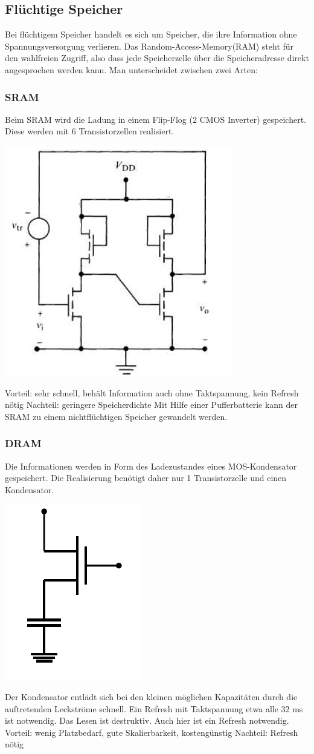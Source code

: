 \subsection{Flüchtige Speicher}
	Bei flüchtigem Speicher handelt es sich um Speicher, die ihre Information ohne Spannungsversorgung verlieren.
	Das Random-Access-Memory(RAM) steht für den wahlfreien Zugriff, also dass jede Speicherzelle über die Speicheradresse direkt angesprochen werden kann. Man unterscheidet zwischen zwei Arten:
	\subsubsection{SRAM}
		Beim SRAM wird die Ladung in einem Flip-Flog (2 CMOS Inverter) gespeichert. Diese werden mit 6 Transistorzellen realisiert. 
		\newline
		\begin{center}
			\includegraphics[width=0.3\linewidth]{Kapitel/Kap07/SRAMZelle.png}
		\end{center}		
		Vorteil: sehr schnell, behält Information auch ohne Taktspannung, kein Refresh nötig
		\newline
		Nachteil: geringere Speicherdichte
		\newline
		Mit Hilfe einer Pufferbatterie kann der SRAM zu einem nichtflüchtigen Speicher gewandelt werden.
	\subsubsection{DRAM}
		Die Informationen werden in Form des Ladezustandes eines  MOS-Kondensator gespeichert. Die Realisierung benötigt daher nur 1 Transistorzelle und einen Kondensator.
		\begin{center}
			\includegraphics[width=0.2\linewidth]{Kapitel/Kap07/DRAMZelle.png}
		\end{center}
		Der Kondensator entlädt sich bei den kleinen möglichen Kapazitäten durch die auftretenden Leckströme schnell. Ein Refresh mit Taktspannung etwa alle 32 ms ist notwendig. Das Lesen ist destruktiv. Auch hier ist ein Refresh notwendig.
		\newline
		Vorteil: wenig Platzbedarf, gute Skalierbarkeit, kostengünstig
		\newline
		Nachteil: Refresh nötig
		\newline
		

